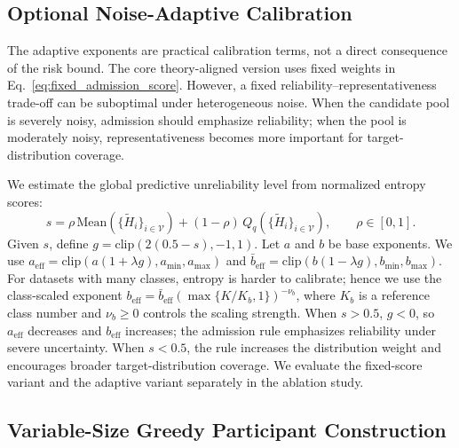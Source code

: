 \documentclass[conference]{IEEEtran}
\theoremstyle{definition}
\theoremstyle{remark}
\begin{document}
\subsection{Optional Noise-Adaptive Calibration}
\label{subsec:adaptive_calibration}

The adaptive exponents are practical calibration terms, not a direct consequence of the risk bound.
The core theory-aligned version uses fixed weights in Eq.~\eqref{eq:fixed_admission_score}.
However, a fixed reliability--representativeness trade-off can be suboptimal under heterogeneous noise.
When the candidate pool is severely noisy, admission should emphasize reliability; when the pool is moderately noisy, representativeness becomes more important for target-distribution coverage.

We estimate the global predictive unreliability level from normalized entropy scores:
\begin{equation}
\label{eq:global_noise_score}
s
=
\rho\,\mathrm{Mean}(\{\widetilde H_i\}_{i\in\mathcal V})
+
(1-\rho)\,Q_q(\{\widetilde H_i\}_{i\in\mathcal V}),
\qquad
\rho\in[0,1].
\end{equation}
Given $s$, define $g=\mathrm{clip}(2(0.5-s),-1,1)$.
Let $a$ and $b$ be base exponents.
We use $a_{\mathrm{eff}}=\mathrm{clip}(a(1+\lambda g),a_{\min},a_{\max})$ and $\bar b_{\mathrm{eff}}=\mathrm{clip}(b(1-\lambda g),b_{\min},b_{\max})$.
For datasets with many classes, entropy is harder to calibrate; hence we use the class-scaled exponent $b_{\mathrm{eff}}=\bar b_{\mathrm{eff}}(\max\{K/K_b,1\})^{-\nu_b}$, where $K_b$ is a reference class number and $\nu_b\ge0$ controls the scaling strength.
When $s>0.5$, $g<0$, so $a_{\mathrm{eff}}$ decreases and $b_{\mathrm{eff}}$ increases; the admission rule emphasizes reliability under severe uncertainty.
When $s<0.5$, the rule increases the distribution weight and encourages broader target-distribution coverage.
We evaluate the fixed-score variant and the adaptive variant separately in the ablation study.

\subsection{Variable-Size Greedy Participant Construction}
\label{subsec:variable_greedy}
\end{document}
